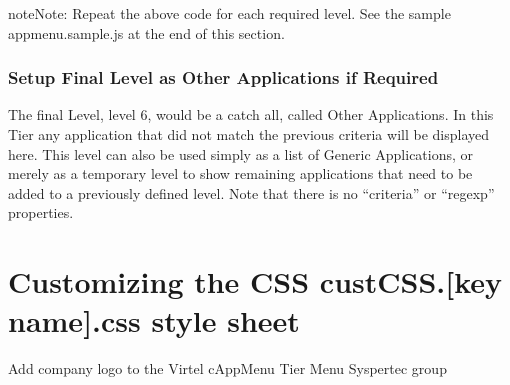 \documentclass[letterpaper,10pt,english]{sphinxmanual}
\begin{document}
\begin{sphinxadmonition}{note}{Note:}
\sphinxAtStartPar
Repeat the above code for each required level. See the sample appmenu.sample.js at the end of this section.
\end{sphinxadmonition}


\subsubsection{Setup Final Level as Other Applications if Required}
\label{\detokenize{Customization:setup-final-level-as-other-applications-if-required}}
\sphinxAtStartPar
The final Level, level 6,  would be a catch all, called Other Applications.  In this Tier any application that did not match the previous criteria will be displayed here. This level can also be used simply as a list of Generic Applications, or merely as a temporary level to show remaining applications that need to be added to a previously defined level. Note that there is no “criteria” or “regexp” properties.

\sphinxAtStartPar
{}

\begin{sphinxVerbatim}[commandchars=\\\{\}]
               
\PYG{p}{[}\PYG{p}{]}\PYG{p}{[}\PYG{p}{]}   

\end{sphinxVerbatim}


\section{Customizing the CSS custCSS.{[}key name{]}.css style sheet}
\label{\detokenize{Customization:customizing-the-css-custcss-key-name-css-style-sheet}}
\sphinxAtStartPar
Add company logo to the Virtel cAppMenu Tier Menu Syspertec group

\sphinxAtStartPar
{}
\end{document}
